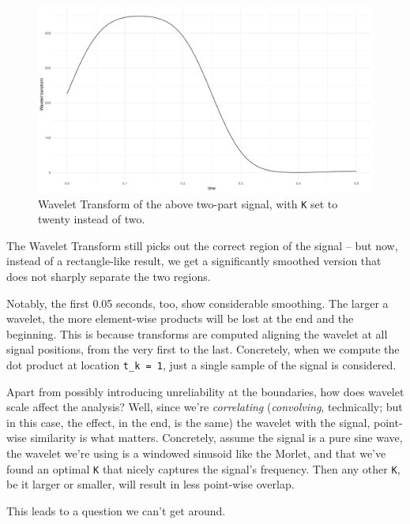 \documentclass[
  letterpaper,
]{krantz}
\begin{document}
\begin{figure}[H]

{\centering \includegraphics{images/wav-signal-short-transform-largeK.png}

}

\caption{\label{fig-wav-signal-short-transform-largeK}Wavelet Transform
of the above two-part signal, with \texttt{K} set to twenty instead of
two.}

\end{figure}

The Wavelet Transform still picks out the correct region of the signal
-- but now, instead of a rectangle-like result, we get a significantly
smoothed version that does not sharply separate the two regions.

Notably, the first 0.05 seconds, too, show considerable smoothing. The
larger a wavelet, the more element-wise products will be lost at the end
and the beginning. This is because transforms are computed aligning the
wavelet at all signal positions, from the very first to the last.
Concretely, when we compute the dot product at location
\texttt{t\_k\ =\ 1}, just a single sample of the signal is considered.

Apart from possibly introducing unreliability at the boundaries, how
does wavelet scale affect the analysis? Well, since we're
\emph{correlating} (\emph{convolving}, technically; but in this case,
the effect, in the end, is the same) the wavelet with the signal,
point-wise similarity is what matters. Concretely, assume the signal is
a pure sine wave, the wavelet we're using is a windowed sinusoid like
the Morlet, and that we've found an optimal \texttt{K} that nicely
captures the signal's frequency. Then any other \texttt{K}, be it larger
or smaller, will result in less point-wise overlap.

This leads to a question we can't get around.
\end{document}
